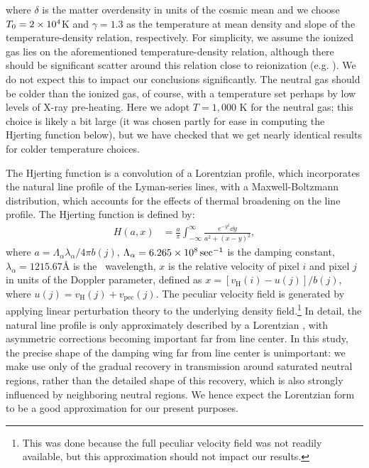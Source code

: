 where $\delta$ is the matter overdensity in units of the cosmic mean and we choose $T_{0} = 2 \times 10^{4}$K and $\gamma = 1.3$ as the temperature at mean density and slope of the temperature-density relation, respectively. For simplicity, we assume the ionized gas lies on the aforementioned temperature-density relation, although there should be significant scatter around this relation close to
reionization (e.g. \citealt{Lidz:2014jxa}). We do not expect this to impact our conclusions significantly. The neutral gas should be colder than the ionized gas, of course, with a temperature set perhaps by low levels of X-ray pre-heating. Here
we adopt $T =1,000$ K for the neutral gas; this choice is likely a bit large (it was chosen partly for ease in computing the Hjerting function below), but we have checked that we get nearly identical results for colder temperature choices.


The Hjerting function is a convolution of a Lorentzian profile, which incorporates the natural line profile of the Lyman-series lines, with a Maxwell-Boltzmann distribution, which accounts for the effects of thermal broadening on the line profile. The Hjerting function is defined by:
\begin{align*}
H(a,x) &= \frac{a}{\pi} \int_{-\infty}^{\infty}\frac{e^{-y^2}\dd y}{a^{2}+ (x-y)^2},
\end{align*}
where $a = \Lambda_{\alpha} \lambda_{\alpha}/4\pi b(j)$, $\Lambda_{\alpha} = 6.265 \times 10^{8}\sec^{-1}$ is the damping constant, $\lambda_{\alpha} = 1215.67 \text{\AA}$ is the \lya\ wavelength, $x$ is the relative velocity of pixel $i$ and pixel $j$ in units of the Doppler parameter, defined as $x = \left[ v_{\text{H}}(i) - u(j) \right]/b(j)$, where $u(j) = v_{\text{H}}(j) + v_{\text{pec}}(j)$. The peculiar velocity field is generated by applying linear perturbation theory to the underlying density field.\footnote{This was done because the full peculiar velocity field was not readily available, but this approximation should not impact our results.}  In detail, the natural line profile is only approximately described by a Lorentzian \citep{Lee:2013fga}, with asymmetric corrections becoming important far from line center. In this study, the
precise shape of the damping wing far from line center is unimportant: we make use only of the gradual recovery in transmission around saturated neutral regions, rather than the detailed shape of this
recovery, which is also strongly influenced by neighboring neutral regions. We hence expect the Lorentzian form to be a good approximation for our present purposes.


